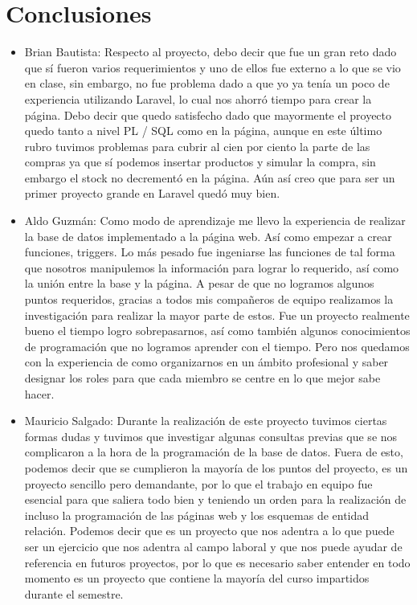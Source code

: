 \documentclass[letterpaper,12pt]{article}
\begin{document}
	\section{Conclusiones}
	\begin{itemize}
		\item Brian Bautista: Respecto al proyecto, debo decir que fue un gran reto dado que sí fueron varios requerimientos y uno de ellos fue externo a lo que se vio en clase, sin embargo, no fue problema dado a que yo ya tenía un poco de experiencia utilizando Laravel, lo cual nos ahorró tiempo para crear la página. Debo decir que quedo satisfecho dado que mayormente el proyecto quedo tanto a nivel PL / SQL como en la página, aunque en este último rubro tuvimos problemas para cubrir al cien por ciento la parte de las compras ya que sí podemos insertar productos y simular la compra, sin embargo el stock no decrementó en la página. Aún así creo que para ser un primer proyecto grande en Laravel quedó muy bien. 
		\item Aldo Guzmán:
		Como modo de aprendizaje me llevo la experiencia de realizar la base de datos implementado a la página web. Así como empezar a crear funciones, triggers. Lo más pesado fue ingeniarse las funciones de tal forma que nosotros manipulemos la información para lograr lo requerido, así como la unión entre la base y la página. A pesar de que no logramos algunos puntos requeridos, gracias a todos mis compañeros de equipo realizamos la investigación para realizar la mayor parte de estos. Fue un proyecto realmente bueno el tiempo logro sobrepasarnos, así como también algunos conocimientos de programación que no logramos aprender con el tiempo. Pero nos quedamos con la experiencia de como organizarnos en un ámbito profesional y saber designar los roles para que cada miembro se centre en lo que mejor sabe hacer.
		\item Mauricio Salgado:
		Durante la realización de este proyecto tuvimos ciertas formas dudas y tuvimos que investigar algunas consultas previas que se nos complicaron a la hora de la programación de la base de datos. Fuera de esto, podemos decir que se cumplieron la mayoría de los puntos del proyecto, es un proyecto sencillo pero demandante, por lo que el trabajo en equipo fue esencial para que saliera todo bien y teniendo un orden para la realización de incluso la programación de las páginas web y los esquemas de entidad relación. Podemos decir que es un proyecto que nos adentra a lo que puede ser un ejercicio que nos adentra al campo laboral y que nos puede ayudar de referencia en futuros proyectos, por lo que es necesario saber entender en todo momento es un proyecto que contiene la mayoría del curso impartidos durante el semestre.

\end{itemize}
\end{document}

